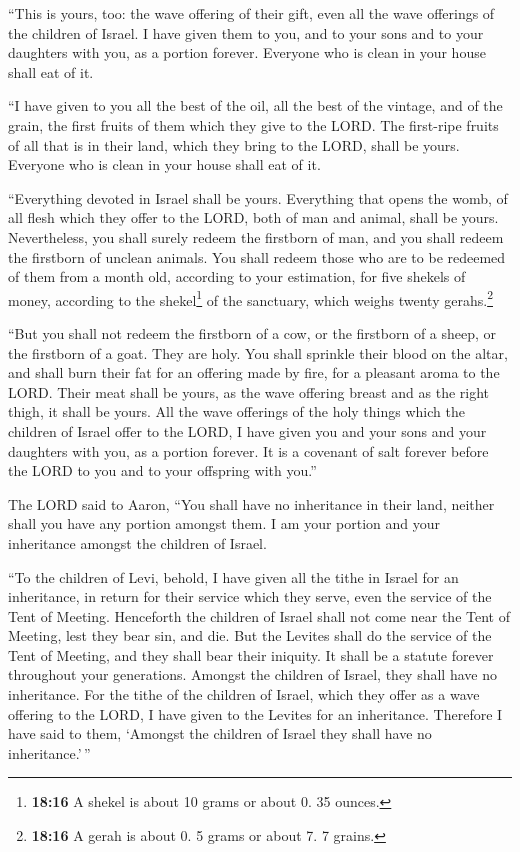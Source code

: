  ``This is yours, too: the wave offering of their gift,
even all the wave offerings of the children of Israel. I have given them
to you, and to your sons and to your daughters with you, as a portion
forever. Everyone who is clean in your house shall eat of it.

 ``I have given to you all the best of the oil, all the
best of the vintage, and of the grain, the first fruits of them which
they give to the LORD.  The first-ripe fruits of all that
is in their land, which they bring to the LORD, shall be yours. Everyone
who is clean in your house shall eat of it.

 ``Everything devoted in Israel shall be yours.
 Everything that opens the womb, of all flesh which they
offer to the LORD, both of man and animal, shall be yours. Nevertheless,
you shall surely redeem the firstborn of man, and you shall redeem the
firstborn of unclean animals.  You shall redeem those who
are to be redeemed of them from a month old, according to your
estimation, for five shekels of money, according to the
shekel\footnote{\textbf{18:16} A shekel is about 10 grams or about 0. 35
  ounces.} of the sanctuary, which weighs twenty gerahs.\footnote{\textbf{18:16}
  A gerah is about 0. 5 grams or about 7. 7 grains.}

 ``But you shall not redeem the firstborn of a cow, or
the firstborn of a sheep, or the firstborn of a goat. They are holy. You
shall sprinkle their blood on the altar, and shall burn their fat for an
offering made by fire, for a pleasant aroma to the LORD. 
Their meat shall be yours, as the wave offering breast and as the right
thigh, it shall be yours.  All the wave offerings of the
holy things which the children of Israel offer to the LORD, I have given
you and your sons and your daughters with you, as a portion forever. It
is a covenant of salt forever before the LORD to you and to your
offspring with you.''

 The LORD said to Aaron, ``You shall have no inheritance
in their land, neither shall you have any portion amongst them. I am
your portion and your inheritance amongst the children of Israel.

 ``To the children of Levi, behold, I have given all the
tithe in Israel for an inheritance, in return for their service which
they serve, even the service of the Tent of Meeting. 
Henceforth the children of Israel shall not come near the Tent of
Meeting, lest they bear sin, and die.  But the Levites
shall do the service of the Tent of Meeting, and they shall bear their
iniquity. It shall be a statute forever throughout your generations.
Amongst the children of Israel, they shall have no inheritance.
 For the tithe of the children of Israel, which they
offer as a wave offering to the LORD, I have given to the Levites for an
inheritance. Therefore I have said to them, `Amongst the children of
Israel they shall have no inheritance.'\,''

